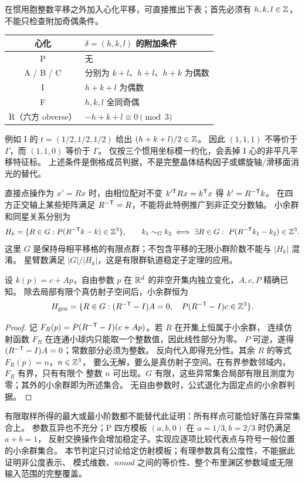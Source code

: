 在惯用胞整数平移之外加入心化平移，可直接推出下表；首先必须有
$h,k,l\in\mathbb Z$，不能只检查附加奇偶条件。
\begin{center}
\begin{tabular}{cl}
\toprule
心化 & $\delta=(h,k,l)$ 的附加条件\\
\midrule
P & 无\\
A / B / C & 分别为 $k+l$、$h+l$、$h+k$ 为偶数\\
I & $h+k+l$ 为偶数\\
F & $h,k,l$ 全同奇偶\\
R（六方 obverse） & $-h+k+l\equiv0\pmod3$\\
\bottomrule
\end{tabular}
\end{center}
例如 I 的 $t=(1/2,1/2,1/2)$ 给出 $(h+k+l)/2\in\mathbb Z$。
因此 $(1,1,1)$ 不等价于 $\Gamma$，而 $(1,1,0)$ 等价于 $\Gamma$。
仅按三个惯用坐标模一约化，会丢掉 I 心的非平凡平移特征标。
上述条件是倒格成员判据，不是完整晶体结构因子或螺旋轴/滑移面消光的替代。

直接点操作为 $x'=Rx$ 时，由相位配对不变
$k'^\T Rx=k^\T x$ 得 $k'=R^{-\mathsf T}k$。
在四方正交轴上某些矩阵满足 $R^{-\mathsf T}=R$，不能将此特例推广到非正交分数轴。
小余群和同星关系分别为
\[
 H_k=\{R\in G:P(R^{-\mathsf T}k-k)\in\mathbb Z^3\},\qquad
 k_1\sim_G k_2\iff\exists R\in G:\ P(R^{-\mathsf T}k_1-k_2)\in\mathbb Z^3.
\]
这里 $G$ 是保持母相平移格的有限点群；不包含平移的无限小群阶数不能与 $|H_k|$ 混淆。
星臂数满足 $|G|/|H_k|$，这是有限群轨道稳定子定理的应用。

\begin{theorem}[仿射模板的一般位置小余群]
设 $k(p)=c+Ap$，自由参数 $p$ 在 $\mathbb R^d$ 的非空开集内独立变化，$A,c,P$ 精确已知。
除去局部有限个真仿射子空间后，小余群恒为
\[
 H_{\rm gen}=\{R\in G:(R^{-\mathsf T}-I)A=0,\quad
                   P(R^{-\mathsf T}-I)c\in\mathbb Z^3\}.
\]
\end{theorem}
\begin{proof}
记 $F_R(p)=P(R^{-\mathsf T}-I)(c+Ap)$。若 $R$ 在开集上恒属于小余群，
连续仿射函数 $F_R$ 在连通小球内只能取一个整数值，因此线性部分为零。
$P$ 可逆，遂得 $(R^{-\mathsf T}-I)A=0$；常数部分必须为整数。
反向代入即得充分性。其余 $R$ 的等式 $F_R(p)=n$，$n\in\mathbb Z^3$，
要么无解，要么是真仿射子空间。在有界参数邻域内，$F_R$ 有界，只有有限个
整数 $n$ 可出现。$G$ 有限，这些异常集合局部有限且测度为零；其外的小余群即为所述集合。
无自由参数时，公式退化为固定点的小余群判据。
\end{proof}

有限取样所得的最大或最小阶数都不能替代此证明：所有样点可能恰好落在异常集合上。
参数互异也不充分；P 四方模板 $(a,b,0)$ 在 $a=1/3,b=2/3$ 时仍满足 $a+b=1$，
反射交换操作会增加稳定子。实现应逐项比较代表点与符号一般位置的小余群集合。
本节判定只讨论给定仿射模板；有理参数具有公度性，不能据此证明非公度表示、
模式维数、$nmod$ 之间的等价性、整个布里渊区参数域或无限输入范围的完整覆盖。

